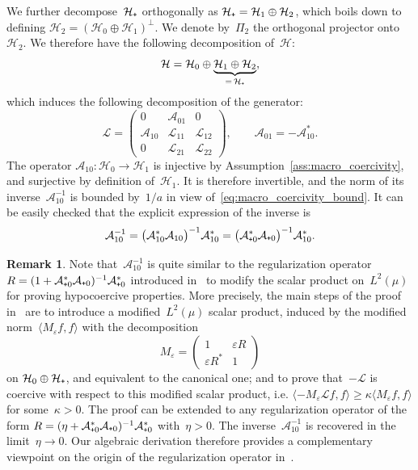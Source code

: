 \documentclass[10pt]{amsart}
\theoremstyle{definition}\newtheorem{defi}[theo]{Definition}\newtheorem{rema}[theo]{Remark}\newtheorem{exam}[theo]{Example}\newtheorem{exem}[theo]{Example}\newtheorem{nota}[theo]{Notation}
\newcommand{\cL}{\mathcal{L}}
\newcommand{\cLa}{\mathcal{A}}
\newcommand{\cH}{\mathcal{H}}
\newcommand{\subplus}{\textnormal{\texttt{+}}}
\renewcommand{\geq}{\geqslant}
\begin{document}
We further decompose~$\cH_\subplus$ orthogonally as $\cH_\subplus = \cH_1 \oplus \cH_2$, which boils down to defining $\cH_2 = (\cH_0 \oplus \cH_1)^\perp$. We denote by~$\Pi_{2}$ the orthogonal projector onto~$\cH_2$. We therefore have the following decomposition of~$\cH$:
\[
\cH = \cH_{0} \oplus \underbrace{\cH_{1} \oplus \cH_{2}}_{=\,\cH_{\subplus}},
\]
which induces the following decomposition of the generator:
\[
\cL =
\begin{pmatrix}
0 & \cLa_{01} & 0 \\
\cLa_{10} & \cL_{11} & \cL_{12} \\
0 & \cL_{21} & \cL_{22}
\end{pmatrix},
\qquad
\cLa_{01} = -\cLa_{10}^{*}.
\]
The operator $\cLa_{10}:\cH_0\to\cH_1$ is injective by Assumption~\ref{ass:macro_coercivity}, and surjective by definition of~$\cH_{1}$. It is therefore invertible, and the norm of its inverse~$\cLa_{10}^{-1}$ is bounded by~$1/a$ in view of~\eqref{eq:macro_coercivity_bound}. It can be easily checked that the explicit expression of the inverse is
\[
\cLa_{10}^{-1} = \big(\cLa_{10}^{*}\cLa_{10}\big)^{-1} \cLa_{10}^{*} = \big(\cLa_{\subplus0}^{*}\cLa_{\subplus0}\big)^{-1} \cLa_{10}^{*}.
\]

\begin{rema}
Note that~$\cLa_{10}^{-1}$ is quite similar to the regularization operator $R = (1+\cLa_{\subplus0}^*\cLa_{\subplus0})^{-1}\cLa_{\subplus 0}^*$ introduced in~\cite{DMS09,DMS15,Herau06} to modify the scalar product on~$L^2(\mu)$ for proving hypocoercive properties. More precisely, the main steps of the proof in~\cite{DMS09,DMS15} are to introduce a modified~$L^2(\mu)$ scalar product, induced by the modified norm~$\langle M_\varepsilon f, f \rangle$ with the decomposition
\[
M_\varepsilon =
\begin{pmatrix}
1 & \varepsilon R\\
\varepsilon R^* & 1
\end{pmatrix}
\]
on $\mathcal{H}_0 \oplus \mathcal{H}_\subplus$, and equivalent to the canonical one; and to prove that~$-\cL$ is coercive with respect to this modified scalar product, i.e. $\langle -M_\varepsilon\cL f, f\rangle \geq \kappa \langle M_\varepsilon f,f\rangle$ for some~$\kappa>0$. The proof can be extended to any regularization operator of the form $R = (\eta+\cLa_{\subplus0}^*\cLa_{\subplus0})^{-1}\cLa_{\subplus 0}^*$ with~$\eta>0$. The inverse~$\cLa_{10}^{-1}$ is recovered in the limit~$\eta \to 0$. Our algebraic derivation therefore provides a complementary viewpoint on the origin of the regularization operator in~\cite{DMS09,DMS15,Herau06}.
\end{rema}
\end{document}
